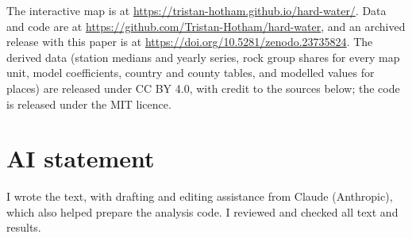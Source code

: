\documentclass[11pt,a4paper]{article}
\begin{document}
The interactive map is at \url{https://tristan-hotham.github.io/hard-water/}. Data and code are at \url{https://github.com/Tristan-Hotham/hard-water}, and an archived release with this paper is at \url{https://doi.org/10.5281/zenodo.23735824}. The derived data (station medians and yearly series, rock group shares for every map unit, model coefficients, country and county tables, and modelled values for places) are released under CC BY 4.0, with credit to the sources below; the code is released under the MIT licence.

\section*{AI statement}

I wrote the text, with drafting and editing assistance from Claude (Anthropic), which also helped prepare the analysis code. I reviewed and checked all text and results.
\end{document}
